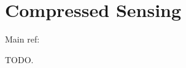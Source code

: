 
\chapter{Compressed Sensing}

Main ref: \cite{mallat2008wavelet,foucart2013mathematical,scherzer2009variational}


TODO.




